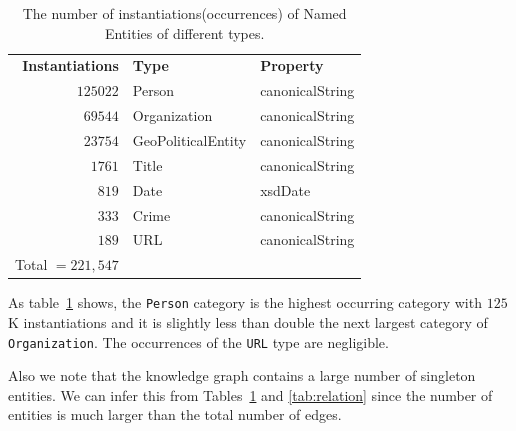 \documentclass[paper=a4,fontsize=11pt]{scrartcl}
\newcommand{\tabref}[1]{table~\ref{#1}}
\numberwithin{equation}{section}    %
\numberwithin{figure}{section}      %
\numberwithin{table}{section}       %
\begin{document}
\begin{table}[htbp]
  \centering
  \begin{tabular}{r l l}
    \textbf{Instantiations} & \textbf{Type}      & \textbf{Property} \\
    $125022$                & Person             & canonicalString   \\
    $69544$                 & Organization       & canonicalString   \\
    $23754$                 & GeoPoliticalEntity & canonicalString   \\
    $1761$                  & Title              & canonicalString   \\
    $819$                   & Date               & xsdDate           \\
    $333$                   & Crime              & canonicalString   \\
    $189$                   & URL                & canonicalString   \\\cline{1-1}
    Total $= 221,547$                                                \\
  \end{tabular}
  \caption{The number of instantiations(occurrences) of Named Entities of different types.}
  \label{tab:type}
\end{table}
As \tabref{tab:type} shows, the \texttt{Person} category is the highest occurring
category with $125$K instantiations
and it is slightly less than double the next largest category of \texttt{Organization}.
The occurrences of the \texttt{URL} type are negligible.

Also we note that the knowledge graph contains a large number of singleton entities.
We can infer this from Tables~\ref{tab:type} and \ref{tab:relation}
since the number of entities is much larger than the total number of edges.
\end{document}
